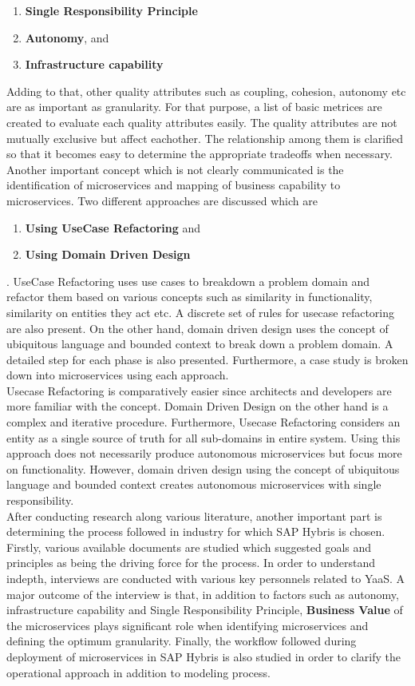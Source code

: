 \begin{enumerate}
\item \textbf{Single Responsibility Principle}
\item \textbf{Autonomy}, and
\item \textbf{Infrastructure capability}
\end{enumerate}
Adding to that, other quality attributes such as coupling, cohesion, autonomy etc are as important as granularity. For that purpose, a list of basic metrices are created to evaluate each quality attributes easily. The quality attributes are not mutually exclusive but affect eachother. The relationship among them is clarified so that it becomes easy to determine the appropriate tradeoffs when necessary.\\
Another important concept which is not clearly communicated is the identification of microservices and mapping of business capability to microservices. Two different approaches are discussed which are 
\begin{enumerate}
\item \textbf{Using UseCase Refactoring} and 
\item \textbf{Using Domain Driven Design}
\end{enumerate}.
UseCase Refactoring uses use cases to breakdown a problem domain and refactor them based on various concepts such as similarity in functionality, similarity on entities they act etc. A discrete set of rules for usecase refactoring are also present. On the other hand, domain driven design uses the concept of ubiquitous language and bounded context to break down a problem domain. A detailed step for each phase is also presented. Furthermore, a case study is broken down into microservices using each approach.\\
Usecase Refactoring is comparatively easier since architects and developers are more familiar with the concept. Domain Driven Design on the other hand is a complex and iterative procedure. Furthermore, Usecase Refactoring considers an entity as a single source of truth for all sub-domains in entire system. Using this approach does not necessarily produce autonomous microservices but focus more on functionality. However, domain driven design using the concept of ubiquitous language and bounded context creates autonomous microservices with single responsibility.\\
After conducting research along various literature, another important part is determining the process followed in industry for which SAP Hybris is chosen. Firstly, various available documents are studied which suggested goals and principles as being the driving force for the process. In order to understand indepth, interviews are conducted with various key personnels related to \acrshort{YaaS}. A major outcome of the interview is that, in addition to factors such as autonomy, infrastructure capability and Single Responsibility Principle, \textbf{Business Value} of the microservices plays significant role when identifying microservices  and defining the optimum granularity. Finally, the workflow followed during deployment of microservices in SAP Hybris is also studied in order to clarify the operational approach in addition to modeling process.\\
